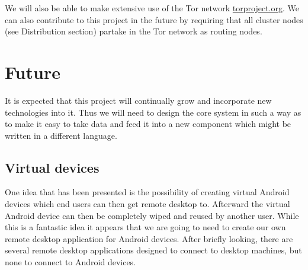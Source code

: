 \documentclass[a4paper]{article}
\begin{document}
We will also be able to make extensive use of the Tor network
\href{https://www.torproject.org/}{torproject.org}. We can also contribute to
this project in the future by requiring that all cluster nodes (see
Distribution section) partake in the Tor network as routing nodes. 


\section{Future}
It is expected that this project will continually grow and incorporate new
technologies into it. Thus we will need to design the core system in such a way
as to make it easy to take data and feed it into a new component which might be
written in a different language. 

\subsection{Virtual devices}
One idea that has been presented is the possibility of creating virtual Android
devices which end users can then get remote desktop to. Afterward the virtual
Android device can then be completely wiped and reused by another user. While
this is a fantastic idea it appears that we are going to need to create our own
remote desktop application for Android devices. After briefly looking, there
are several remote desktop applications designed to connect to desktop
machines, but none to connect to Android devices.
\end{document}
